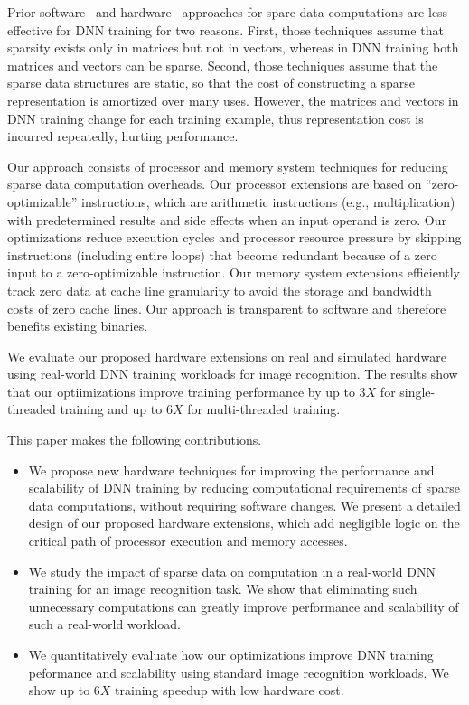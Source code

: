 Prior software~\cite{Eisenstat82, IntelSparseMatrix} and hardware~\cite{Carter99, Srinidhi12, Fowers13} approaches for spare data computations are less effective for DNN training for two reasons.  First, those techniques assume that sparsity exists only in matrices but not in vectors, whereas in DNN training both matrices and vectors can be sparse.  Second, those techniques assume that the sparse data structures are static, so that the cost of constructing a sparse representation is amortized over many uses.  However, the matrices and vectors in DNN training change for each training example, thus representation cost is incurred repeatedly, hurting performance. 

Our approach consists of processor and memory system techniques for reducing sparse data computation overheads.  Our processor extensions are based on ``zero-optimizable'' instructions, which are arithmetic instructions (e.g., multiplication) with predetermined results and side effects when an input operand is zero. Our optimizations reduce execution cycles and processor resource pressure by skipping instructions (including entire loops) that become redundant because of a zero input to a zero-optimizable instruction.  Our memory system extensions efficiently track zero data at cache line granularity to avoid the storage and bandwidth costs of zero cache lines.  Our approach is transparent to software and therefore benefits existing binaries. 

We evaluate our proposed hardware extensions on real and simulated hardware using real-world DNN training workloads for image recognition. The results show that our optiimizations improve training performance by up to $3X$ for single-threaded training and up to $6X$ for multi-threaded training. 

This paper makes the following contributions.
\begin{itemize}

\item We propose new hardware techniques for improving the performance and scalability of DNN training by reducing computational requirements of sparse data computations, without requiring software changes.  We present a detailed design of our proposed hardware extensions, which add negligible logic on the critical path of processor execution and memory accesses. 
\item We study the impact of sparse data on computation in a real-world DNN training for an image recognition task. We show that eliminating such unnecessary computations can greatly improve performance and scalability of such a real-world workload.
\item We quantitatively evaluate how our optimizations improve DNN training peformance and scalability using standard image recognition workloads. We show up to $6X$ training speedup with low hardware cost. 

\end{itemize}

